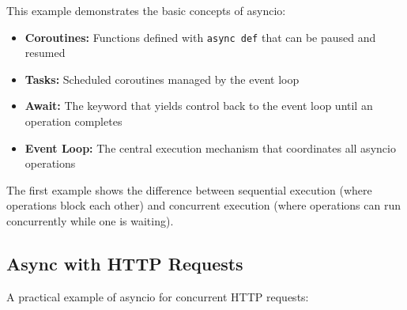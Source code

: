 \documentclass[12pt,letterpaper]{article}
\begin{document}
This example demonstrates the basic concepts of asyncio:

\begin{itemize}
    \item \textbf{\textcolor{pythonBlue}{Coroutines:}} Functions defined with \texttt{async def} that can be paused and resumed
    \item \textbf{\textcolor{pythonBlue}{Tasks:}} Scheduled coroutines managed by the event loop
    \item \textbf{\textcolor{pythonBlue}{Await:}} The keyword that yields control back to the event loop until an operation completes
    \item \textbf{\textcolor{pythonBlue}{Event Loop:}} The central execution mechanism that coordinates all asyncio operations
\end{itemize}

The first example shows the difference between sequential execution (where operations block each other) and concurrent execution (where operations can run concurrently while one is waiting).

\subsection{Async with HTTP Requests}

A practical example of asyncio for concurrent HTTP requests:
\end{document}
